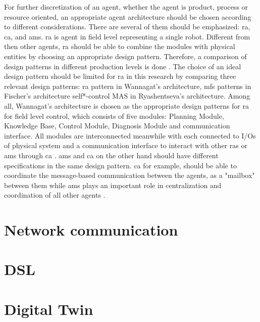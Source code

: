 For further discretization of an agent, whether the agent is product, process or resource oriented, an appropriate agent architecture should be chosen according to different considerations. There are several of them should be emphasized: \gls{ra}, \gls{ca}, and \gls{ams}. \gls{ra} is agent in field level representing a single robot. Different from then other agents, \gls{ra} should be able to combine the modules with physical entities by choosing an appropriate design pattern. Therefore, a comparison of design patterns in different production levels is done \cite{ocker_leveraging_2021}. The choice of an ideal design pattern should be limited for \gls{ra} in this research by comparing three relevant design patterns:  \gls{ra} pattern in Wannagat’s architecture, \gls{mfs} patterns in Fischer’s architecture self*-control MAS in Ryashentseva’s architecture. Among all,  Wannagat’s architecture is chosen as the appropriate design patterns for \gls{ra} for field level control, which consists of five modules: Planning Module, Knowledge Base, Control Module, Diagnosis Module and communication interface. All modules are interconnected meanwhile with each connected to I/Os of physical system and a communication interface to interact with other \gls{ras} or \gls{ams} through \gls{ca} \cite{cruz_salazar_cyber-physical_2019}. \gls{ams} and \gls{ca} on the other hand should have different specifications in the same design pattern. \gls{ca} for example, should be able to coordinate the message-based communication between the agents, as a "mailbox" between them while \gls{ams} plays an important role in centralization and coordination of all other agents \cite{wannagat_entwicklung_2010}. 

\section{Network communication}
\section{DSL}
\section{Digital Twin}


